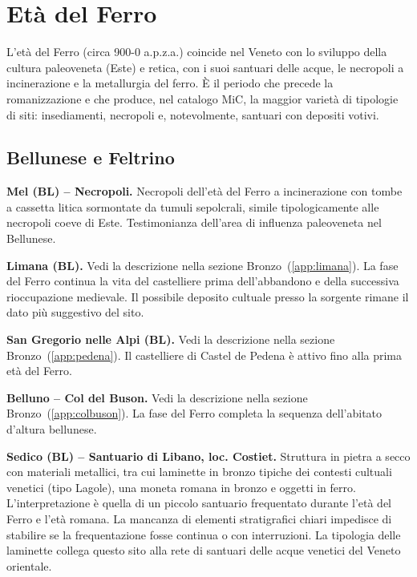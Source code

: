 \section{Età del Ferro}
\label{app:ferro}

L'età del Ferro (circa 900-0 a.p.z.a.) coincide nel Veneto con lo sviluppo della cultura paleoveneta (Este) e retica, con i suoi santuari delle acque, le necropoli a incinerazione e la metallurgia del ferro. È il periodo che precede la romanizzazione e che produce, nel catalogo MiC, la maggior varietà di tipologie di siti: insediamenti, necropoli e, notevolmente, santuari con depositi votivi.

\subsection{Bellunese e Feltrino}

\textbf{Mel (BL) -- Necropoli.} \label{app:mel_nec} Necropoli dell'età del Ferro a incinerazione con tombe a cassetta litica sormontate da tumuli sepolcrali, simile tipologicamente alle necropoli coeve di Este. Testimonianza dell'area di influenza paleoveneta nel Bellunese.

\textbf{Limana (BL).} \label{app:limana_ferro} Vedi la descrizione nella sezione Bronzo~(\ref{app:limana}). La fase del Ferro continua la vita del castelliere prima dell'abbandono e della successiva rioccupazione medievale. Il possibile deposito cultuale presso la sorgente rimane il dato più suggestivo del sito.

\textbf{San Gregorio nelle Alpi (BL).} \label{app:pedena_ferro} Vedi la descrizione nella sezione Bronzo~(\ref{app:pedena}). Il castelliere di Castel de Pedena è attivo fino alla prima età del Ferro.

\textbf{Belluno -- Col del Buson.} \label{app:colbuson_ferro} Vedi la descrizione nella sezione Bronzo~(\ref{app:colbuson}). La fase del Ferro completa la sequenza dell'abitato d'altura bellunese.

\textbf{Sedico (BL) -- Santuario di Libano, loc. Costiet.} Struttura in pietra a secco con materiali metallici, tra cui laminette in bronzo tipiche dei contesti cultuali venetici (tipo Lagole), una moneta romana in bronzo e oggetti in ferro. L'interpretazione è quella di un piccolo santuario frequentato durante l'età del Ferro e l'età romana. La mancanza di elementi stratigrafici chiari impedisce di stabilire se la frequentazione fosse continua o con interruzioni. La tipologia delle laminette collega questo sito alla rete di santuari delle acque venetici del Veneto orientale.

